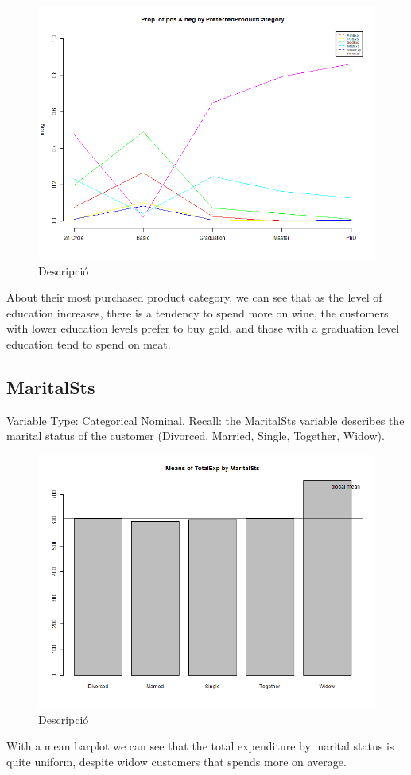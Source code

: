 \begin{figure}[H]
    \centering
    \includegraphics[width=0.8\linewidth]{Imatges/prop_cond_class_PreferredProductCategory_4_legend.png}
    \caption{Descripció}
    \label{fig:scree_plot}
\end{figure}
\newline
About their most purchased product category, we can see that as the level of education increases, there is a tendency to spend more on wine, the customers with lower education levels prefer to buy gold, and those with a graduation level education tend to spend on meat.

\subsection{MaritalSts}
Variable Type: Categorical Nominal.\newline
Recall: the MaritalSts variable describes the marital status of the customer (Divorced, Married, Single, Together, Widow).

\begin{figure}[H]
    \centering
    \includegraphics[width=0.8\linewidth]{Imatges/mean_barplot_TotalExp(2).png}
    \caption{Descripció}
    \label{fig:scree_plot}
\end{figure}
\newline
With a mean barplot we can see that the total expenditure by marital status is quite uniform, despite widow customers that spends more on average.

